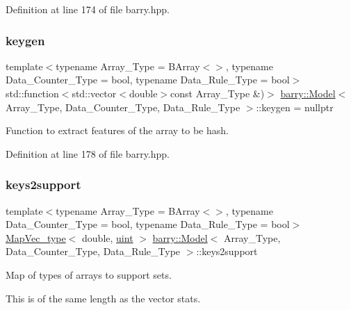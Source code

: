 Definition at line 174 of file barry.\+hpp.

\mbox{\label{classbarry_1_1_model_a68f7422006423a4f0a00c3e4f5d0e1d5}} 
\subsubsection{\texorpdfstring{keygen}{keygen}}
{\footnotesize\ttfamily template$<$typename Array\+\_\+\+Type  = B\+Array$<$$>$, typename Data\+\_\+\+Counter\+\_\+\+Type  = bool, typename Data\+\_\+\+Rule\+\_\+\+Type  = bool$>$ \\
std\+::function$<$std\+::vector$<$double$>$const Array\+\_\+\+Type \&)$>$ \hyperlink{classbarry_1_1_model}{barry\+::\+Model}$<$ Array\+\_\+\+Type, Data\+\_\+\+Counter\+\_\+\+Type, Data\+\_\+\+Rule\+\_\+\+Type $>$\+::keygen = nullptr}



Function to extract features of the array to be hash. 



Definition at line 178 of file barry.\+hpp.

\mbox{\label{classbarry_1_1_model_a802069270d02f2e2ad7e5f2adb51c2bc}} 
\subsubsection{\texorpdfstring{keys2support}{keys2support}}
{\footnotesize\ttfamily template$<$typename Array\+\_\+\+Type  = B\+Array$<$$>$, typename Data\+\_\+\+Counter\+\_\+\+Type  = bool, typename Data\+\_\+\+Rule\+\_\+\+Type  = bool$>$ \\
\hyperlink{namespacebarry_a2f0d3aab1d67e4c8eaeab9022e16139f}{Map\+Vec\+\_\+type}$<$ double, \hyperlink{namespacebarry_a11dfc53ddb4672278319aa04f1e09a6c}{uint} $>$ \hyperlink{classbarry_1_1_model}{barry\+::\+Model}$<$ Array\+\_\+\+Type, Data\+\_\+\+Counter\+\_\+\+Type, Data\+\_\+\+Rule\+\_\+\+Type $>$\+::keys2support}



Map of types of arrays to support sets. 

This is of the same length as the vector {\ttfamily stats}. 

